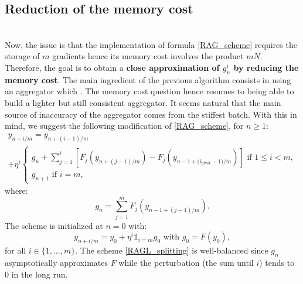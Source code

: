 \documentclass[article,authoryear,jmlmc]{beg_32}             %
\begin{document}
\subsection{Reduction of the memory cost}
\label{red_mem}
~~\\
Now, the issue is that the implementation of formula \eqref{RAG_scheme} requires the storage of $m$ gradients hence its memory cost involves the product $mN$. Therefore, the goal is to obtain a \textbf{close approximation of $g_n^i$ by reducing the memory cost}.
The main ingredient of the previous algorithm consists in using an aggregator which .
The memory cost question hence resumes to being able to build a lighter but still consistent aggregator.
It seems natural that the main source of inaccuracy of the aggregator comes from the stiffest batch. 
With this in mind, we suggest the following modification of \eqref{RAG_scheme}, for $n\geq 1$:
\begin{multline}
	y_{n+i/m} = y_{n+(i-1)/m} \\
	+\eta^i
	\left\{
	\begin{array}{ll}
          g_n+\displaystyle{\sum_{j=1}^i} \left[F_j\left(y_{n+(j-1)/m}\right)-F_j\left(y_{{n-1+(i_{\text{pivot}}-1})/m}\right)\right] \text{ if } 1\leq i<m,\\
		g_{n+1} \text{ if } i=m,
	\end{array}
	\right.
	\label{RAGL_splitting}
\end{multline}
where:
\begin{equation*}
	g_n = \sum_{j=1}^m F_j\left(y_{n-1+(j-1)/m}\right).
\end{equation*}
The scheme is initialized at $n=0$ with:
\begin{equation*}
	y_{n+i/m} = y_0 + \eta^i \mathds{1}_{i=m} g_0 \text{ with } g_0 = F(y_0),
\end{equation*}
for all $i \in \{1,\dots,m\}$. 
The scheme \eqref{RAGL_splitting} is well-balanced since $g_n$ asymptotically approximates $F$ while the perturbation (the sum until $i$) tends to 0 in the long run. \\
\end{document}
